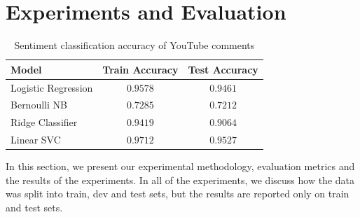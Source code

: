 \section{Experiments and Evaluation}
\label{sec:exp}
\begin{table}%
\centering
\begin{tabular}{|l|c|c|}
\hline
Model & Train Accuracy & Test Accuracy \\
\hline
Logistic Regression & $0.9578$ & $0.9461$ \\
\hline
Bernoulli NB & $0.7285$ & $0.7212$ \\
\hline
Ridge Classifier & $0.9419$ & $0.9064$ \\
\hline
Linear SVC & $0.9712$ & $0.9527$ \\
\hline
\end{tabular}
\caption{Sentiment classification accuracy of YouTube comments}
\label{tab:accuracy}
\end{table}

In this section, we present our experimental methodology, evaluation metrics and the results of the experiments. In all of the experiments, we discuss how the data was split into train, dev and test sets, but the results are reported only on train and test sets.

